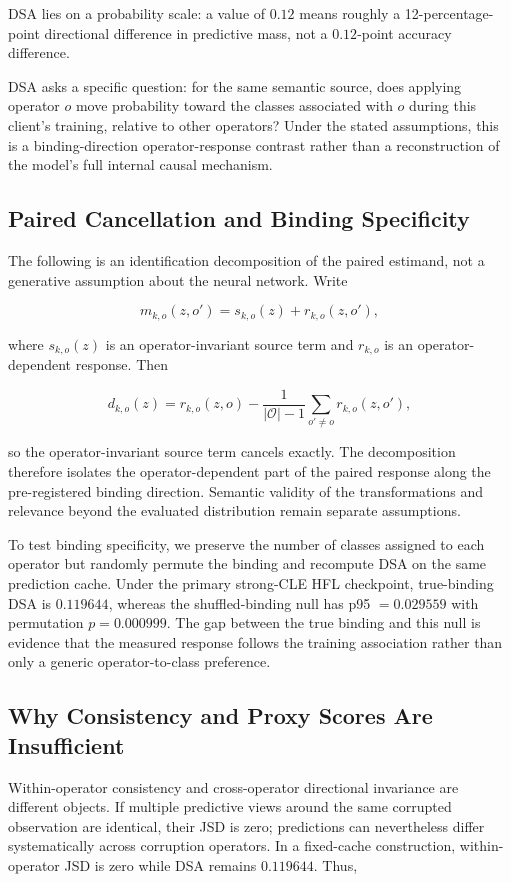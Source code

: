 DSA lies on a probability scale: a value of \(0.12\) means roughly a 12-percentage-point directional difference in predictive mass, not a \(0.12\)-point accuracy difference.

DSA asks a specific question: for the same semantic source, does applying operator \(o\) move probability toward the classes associated with \(o\) during this client's training, relative to other operators? Under the stated assumptions, this is a binding-direction operator-response contrast rather than a reconstruction of the model's full internal causal mechanism.

\subsection{Paired Cancellation and Binding Specificity}

The following is an identification decomposition of the paired estimand, not a generative assumption about the neural network. Write

\[
m_{k,o}(z,o')=s_{k,o}(z)+r_{k,o}(z,o'),
\]

where \(s_{k,o}(z)\) is an operator-invariant source term and \(r_{k,o}\) is an operator-dependent response. Then

\[
d_{k,o}(z)=r_{k,o}(z,o)
-\frac{1}{|\mathcal O|-1}\sum_{o'\neq o}r_{k,o}(z,o'),
\]

so the operator-invariant source term cancels exactly. The decomposition therefore isolates the operator-dependent part of the paired response along the pre-registered binding direction. Semantic validity of the transformations and relevance beyond the evaluated distribution remain separate assumptions.

To test binding specificity, we preserve the number of classes assigned to each operator but randomly permute the binding and recompute DSA on the same prediction cache. Under the primary strong-CLE HFL checkpoint, true-binding DSA is \(0.119644\), whereas the shuffled-binding null has p95 \(=0.029559\) with permutation \(p=0.000999\). The gap between the true binding and this null is evidence that the measured response follows the training association rather than only a generic operator-to-class preference.

\subsection{Why Consistency and Proxy Scores Are Insufficient}

Within-operator consistency and cross-operator directional invariance are different objects. If multiple predictive views around the same corrupted observation are identical, their JSD is zero; predictions can nevertheless differ systematically across corruption operators. In a fixed-cache construction, within-operator JSD is zero while DSA remains \(0.119644\). Thus,

